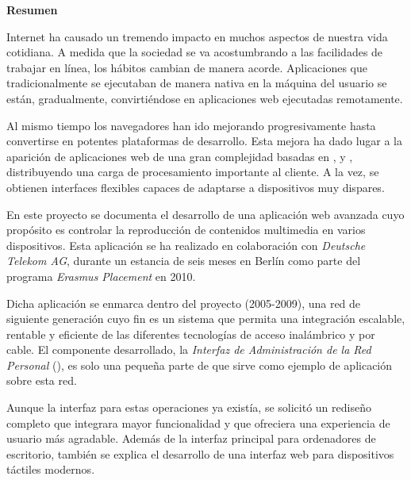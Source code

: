 \begin{center}
  \Large{\textbf{Resumen}}
\end{center}

Internet ha causado un tremendo impacto en muchos aspectos de nuestra vida cotidiana.
A medida que la sociedad se va acostumbrando a las facilidades de trabajar en línea, los hábitos cambian de manera acorde.
Aplicaciones que tradicionalmente se ejecutaban de manera nativa en la máquina del usuario se están, gradualmente, convirtiéndose en aplicaciones web ejecutadas remotamente.

Al mismo tiempo los navegadores han ido mejorando progresivamente hasta convertirse en potentes plataformas de desarrollo.
Esta mejora ha dado lugar a la aparición de aplicaciones web de una gran complejidad basadas en ,  y , distribuyendo una carga de procesamiento importante al cliente.
A la vez, se obtienen interfaces flexibles capaces de adaptarse a dispositivos muy dispares.

En este proyecto se documenta el desarrollo de una aplicación web avanzada cuyo propósito es controlar la reproducción de contenidos multimedia en varios dispositivos.
Esta aplicación se ha realizado en colaboración con \emph{Deutsche Telekom AG}, durante un estancia de seis meses en Berlín como parte del programa \emph{Erasmus Placement} en 2010.

Dicha aplicación se enmarca dentro del proyecto  (2005-2009), una red de siguiente generación cuyo fin es un sistema que permita una integración escalable, rentable y eficiente de las diferentes tecnologías de acceso inalámbrico y por cable.
El componente desarrollado, la \emph{Interfaz de Administración de la Red Personal} (), es solo una pequeña parte de  que sirve como ejemplo de aplicación sobre esta red.

Aunque la interfaz para estas operaciones ya existía, se solicitó un rediseño completo que integrara mayor funcionalidad y que ofreciera una experiencia de usuario más agradable.
Además de la interfaz principal para ordenadores de escritorio, también se explica el desarrollo de una interfaz web para dispositivos táctiles modernos.

